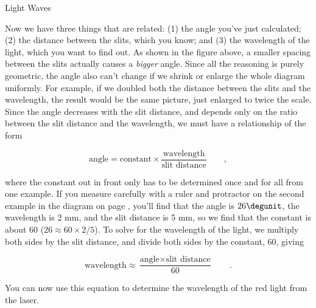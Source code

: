 \begin{lab}{Light Waves}
\label{fig:compareslits}

Now we have three things that are related: (1) the angle you've just calculated; (2) the distance
between the slits, which you know; and (3) the wavelength of the light, which you want to find out.
As shown in the figure above, a smaller spacing between the slits actually causes a \emph{bigger}
angle. Since all the reasoning is purely geometric, the angle also can't change if we shrink or
enlarge the whole diagram uniformly. For example, if we doubled both the distance between the slits
and the wavelength, the result would be the same picture, just enlarged to twice the scale. Since
the angle decreases with the slit distance, and depends only on the ratio between the slit distance
and the wavelength, we must have a relationship of the form

\begin{equation*}
  \text{angle} = \text{constant}\times\frac{\text{wavelength}}{\text{slit distance}} \qquad ,
\end{equation*}

where the constant out in front only has to be determined once and for all from one example. If you
measure carefully with a ruler and protractor on
the second example in the diagram on page \pageref{fig:compareslits}, you'll find that the angle is $26\degunit$, the wavelength is 2 mm, and the slit distance
is 5 mm, so we find that the constant is about 60 ($26\approx 60\times 2/5$). To solve for the wavelength
of the light, we multiply both sides by the slit distance, and divide both sides by the constant, 60, giving

\begin{equation*}
  \text{wavelength} \approx \frac{\text{angle}\times\text{slit distance}}{60} \qquad .
\end{equation*}


You can now use this equation to determine the wavelength of the red light from the laser.

\end{lab}


